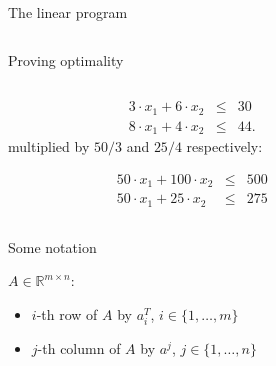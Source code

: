 \begin{frame}{The linear program}
\begin{columns}
\begin{column}{.5\textwidth}
    \end{column}       
  \end{columns}
\end{frame}




\begin{frame}{Proving optimality}

  \begin{columns}
    \begin{column}{.5\textwidth}
      \begin{eqnarray*}
        3\cdot x_1 + 6 \cdot x_2 & \leq & 30 \\
        8\cdot x_1 + 4 \cdot x_2 & \leq & 44.  \label{eq:1-3}
      \end{eqnarray*}
      multiplied by $50/3$ and $25/4$ respectively:

      \bigskip

      \begin{eqnarray*}
        50\cdot x_1 + 100 \cdot x_2 & \leq & 500 \\
        50\cdot x_1 + 25 \cdot x_2 & \leq & 275  \label{eq:1-6}
      \end{eqnarray*}
    \end{column}
    \begin{column}{.5\textwidth}
      
    \end{column}       
  \end{columns}
\end{frame}




\begin{frame}{Some notation}

      $A \in ℝ^{m\times n}$: 
      \begin{itemize}
      \item $i$-th row of  $A$ by  $a^T_i$,  $i\in
        \{1,\ldots,m\}$        
      \item $j$-th column of $A$  by $a^j$, $ j \in \{ 1,\ldots,n\}$         
      \end{itemize}
      
\end{frame}




